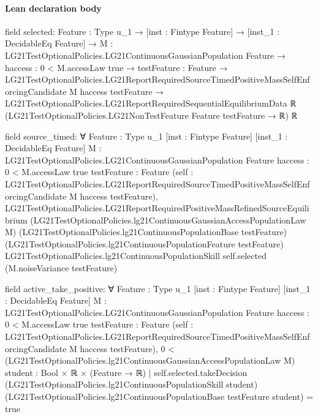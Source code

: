 \documentclass[10pt]{article}
\begin{document}
\paragraph{Lean declaration body}
\begin{ReviewVerbatim}
field selected:
{Feature : Type u_1} →
  [inst : Fintype Feature] →
    [inst_1 : DecidableEq Feature] →
      {M : LG21TestOptionalPolicies.LG21ContinuousGaussianPopulation Feature} →
        {haccess : 0 < M.accessLaw {true}} →
          {testFeature : Feature} →
            LG21TestOptionalPolicies.LG21ReportRequiredSourceTimedPositiveMassSelfEnforcingCandidate M haccess
                testFeature →
              LG21TestOptionalPolicies.LG21ReportRequiredSequentialEquilibriumData ℝ
                (LG21TestOptionalPolicies.LG21NonTestFeature Feature testFeature → ℝ) ℝ

field source_timed:
∀ {Feature : Type u_1} [inst : Fintype Feature] [inst_1 : DecidableEq Feature]
  {M : LG21TestOptionalPolicies.LG21ContinuousGaussianPopulation Feature} {haccess : 0 < M.accessLaw {true}}
  {testFeature : Feature}
  (self :
    LG21TestOptionalPolicies.LG21ReportRequiredSourceTimedPositiveMassSelfEnforcingCandidate M haccess testFeature),
  LG21TestOptionalPolicies.LG21ReportRequiredPositiveMassRefinedSourceEquilibrium
    (LG21TestOptionalPolicies.lg21ContinuousGaussianAccessPopulationLaw M)
    (LG21TestOptionalPolicies.lg21ContinuousPopulationBase testFeature)
    (LG21TestOptionalPolicies.lg21ContinuousPopulationFeature testFeature)
    LG21TestOptionalPolicies.lg21ContinuousPopulationSkill self.selected (M.noiseVariance testFeature)

field active_take_positive:
∀ {Feature : Type u_1} [inst : Fintype Feature] [inst_1 : DecidableEq Feature]
  {M : LG21TestOptionalPolicies.LG21ContinuousGaussianPopulation Feature} {haccess : 0 < M.accessLaw {true}}
  {testFeature : Feature}
  (self :
    LG21TestOptionalPolicies.LG21ReportRequiredSourceTimedPositiveMassSelfEnforcingCandidate M haccess testFeature),
  0 <
    (LG21TestOptionalPolicies.lg21ContinuousGaussianAccessPopulationLaw M)
      {student : Bool × ℝ × (Feature → ℝ) |
        self.selected.takeDecision (LG21TestOptionalPolicies.lg21ContinuousPopulationSkill student)
            (LG21TestOptionalPolicies.lg21ContinuousPopulationBase testFeature student) =
          true}


\end{ReviewVerbatim}
\end{document}
